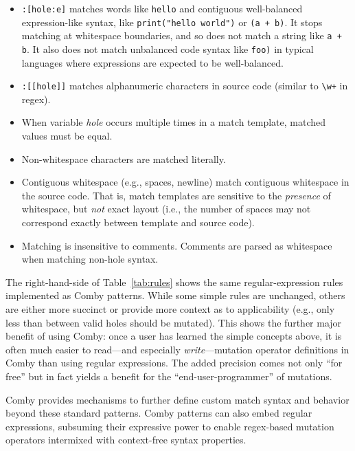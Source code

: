 \documentclass[acmsmall]{acmart}
\begin{document}
{\begin{itemize}
\item \texttt{\small:[hole:e]} matches words like \texttt{\small hello} and contiguous well-balanced expression-like syntax, like \texttt{\small print("hello world")} or \texttt{\small (a + b)}. It stops matching at whitespace boundaries, and so does not match a string like \texttt{\small a + b}. It also does not match unbalanced code syntax like \texttt{\small foo)} in typical languages where expressions are expected to be well-balanced.

\item \texttt{\small :[[hole]]} matches alphanumeric characters in source code (similar to \texttt{\small\textbackslash w+} in regex).

\item When variable \emph{hole} occurs multiple times in a match
  template, matched values must be equal.

\item Non-whitespace characters are matched literally.

\item Contiguous whitespace (e.g., spaces, newline) match contiguous whitespace in the source code. That is, match templates are sensitive to the \emph{presence} of whitespace, but \emph{not} exact layout (i.e., the number of spaces may not correspond exactly between template and source code).

\item Matching is insensitive to comments. Comments are parsed as whitespace when matching non-hole syntax.

\end{itemize}

The right-hand-side of Table~\ref{tab:rules} shows the same regular-expression rules 
implemented as Comby patterns.  While some simple rules are
unchanged, others are either more succinct or provide more context as
to applicability (e.g., only less than between valid holes should be
mutated).  This shows the
further major benefit of using Comby: once a user has learned
the simple concepts above, it is often much easier to read---and
especially \emph{write}---mutation
operator definitions in Comby than using regular expressions.  The
added precision comes not only ``for free'' but in fact yields a
benefit for the ``end-user-programmer'' of mutations.

Comby provides mechanisms to further define custom match syntax and behavior
beyond these standard patterns. Comby patterns can also embed regular expressions, subsuming their
expressive power to enable regex-based mutation operators intermixed with
context-free syntax
properties.



}
\end{document}
